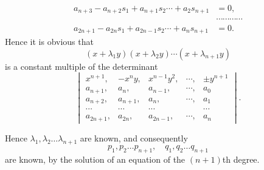 \documentclass[11pt]{article}
\newcommand{\sourcepage}[1]{\marginpar{\scriptsize p.~#1}}
\begin{document}
{{\[\begin{aligned}
a_{n+3}-a_{n+2}s_1+a_{n+1}s_2\cdots+a_2s_{n+1}&=0,\\
&\cdots\cdots\cdots\cdots\\
a_{2n+1}-a_{2n}s_1+a_{2n-1}s_2\cdots+a_ns_{n+1}&=0.
\end{aligned}
\]
Hence it is obvious that
\[
(x+\lambda_1y)(x+\lambda_2y)\cdots(x+\lambda_{n+1}y)
\]
is a constant multiple of the determinant
\[
\begin{vmatrix}
x^{n+1},&-x^ny,&x^{n-1}y^2,&\cdots,&\pm y^{n+1}\\
a_{n+1},&a_n,&a_{n-1},&\cdots,&a_0\\
a_{n+2},&a_{n+1},&a_n,&\cdots,&a_1\\
\cdots&\cdots&\cdots&&\cdots\\
a_{2n+1},&a_{2n},&a_{2n-1},&\cdots,&a_n
\end{vmatrix}.
\]

\sourcepage{267}
Hence $\lambda_1,\lambda_2\ldots\lambda_{n+1}$ are known, and consequently
\[
p_1,p_2\ldots p_{n+1},\quad q_1,q_2\ldots q_{n+1}
\]
are known, by the solution of an equation of the $(n+1)$th degree.

}}
\end{document}

